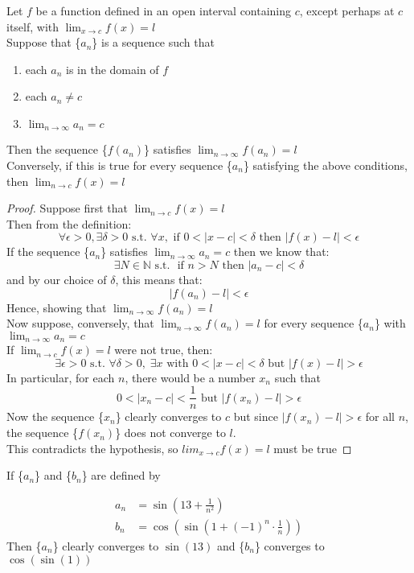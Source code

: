 \begin{theorem}
Let $f$ be a function defined in an open interval containing $c$, except perhaps at $c$ itself, with $\lim_{x \to c}f(x) = l$ \\
Suppose that \{$a_n$\} is a sequence such that 
\begin{enumerate}
    \item each $a_n$ is in the domain of $f$
    \item each $a_n \neq c$
    \item $\lim_{n\to \infty} a_n = c$
\end{enumerate}
Then the sequence \{$f(a_n)$\} satisfies $\lim_{n\to \infty} f(a_n) = l$ \\
Conversely, if this is true for every sequence \{$a_n$\} satisfying the above conditions, then $\lim_{n\to c} f(x) = l$
\end{theorem}
\begin{proof}
    Suppose first that $\lim_{n\to c} f(x) = l$\\
    Then from the definition: 
    $$\forall \epsilon > 0, \exists \delta > 0 \text{ s.t. } \forall x, \text{ if } 0 <|x-c|<\delta \text{ then } |f(x)-l| < \epsilon $$ 
    If the sequence \{$a_n$\} satisfies $\lim_{n\to \infty} a_n = c$ then we know that: 
    $$\exists N\in \mathbb{N} \text{ s.t. } \text{ if } n>N \text{ then }|a_n - c| <\delta$$ 
    and by our choice of $\delta$, this means that:
        $$|f(a_n) - l| < \epsilon$$
    Hence, showing that $\lim_{n\to\infty}f(a_n) = l$ \bigskip \\ 
    Now suppose, conversely, that $\lim_{n\to\infty}f(a_n) = l$ for every sequence 
    \{$a_n$\} with $\lim_{n\to \infty}a_n = c$ \smallskip \\
    If $\lim_{n\to c} f(x) = l$ were not true, then:
    $$ \exists \epsilon > 0 \text{ s.t. } \forall \delta > 0, \; \exists x \text{ with } 0 < |x - c| < \delta \text{ but } |f(x) - l| > \epsilon $$
    In particular, for each $n$, there would be a number $x_n$ such that 
    $$  0 < |x_n - c| < \frac{1}{n} \text{ but } |f(x_n) - l| > \epsilon $$
    Now the sequence \{$x_n$\} clearly converges to $c$ but since $|f(x_n) - l| > \epsilon$ for all $n$, the sequence \{$f(x_n)$\} does not converge to $l$. \\
    This contradicts the hypothesis, so $lim_{x\to c}f(x) = l$ must be true
\end{proof}\bigskip

\begin{eg}
    If \{$a_n$\} and \{$b_n$\} are defined by
    
    \begin{align*}
        a_n &= \sin \left( 13 + \frac{1}{n^2} \right) \\
        b_n &= \cos \left( \sin \left( 1 + (-1)^n \cdot \frac{1}{n} \right) \right)
    \end{align*}
    Then  \{$a_n$\} clearly converges to $\sin (13)$ and \{$b_n$\} converges to $\cos(\sin(1))$
\end{eg} \bigskip

